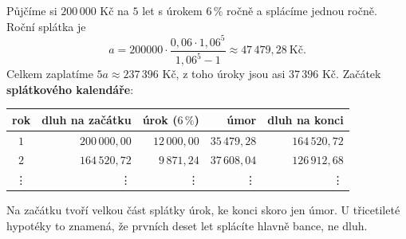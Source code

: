 \begin{example}\label{ex:splatkovy-kalendar}
  Půjčíme si $200\,000$ Kč na $5$ let s úrokem $6\,\%$ ročně a splácíme jednou ročně. Roční splátka je
  \begin{equation*}
    a = 200000\cdot\frac{0{,}06\cdot 1{,}06^5}{1{,}06^5 - 1}\approx 47\,479{,}28\ \text{Kč}.
  \end{equation*}
  Celkem zaplatíme $5a\approx 237\,396$ Kč, z toho úroky jsou asi $37\,396$ Kč. Začátek \textbf{splátkového kalendáře}:
  \begin{center}
    \renewcommand{\arraystretch}{1.3}
    \begin{tabular}{|c|r|r|r|r|}
      \hline
      rok & dluh na začátku & úrok ($6\,\%$) & úmor & dluh na konci \\
      \hline
      $1$ & $200\,000{,}00$ & $12\,000{,}00$ & $35\,479{,}28$ & $164\,520{,}72$ \\
      $2$ & $164\,520{,}72$ & $9\,871{,}24$ & $37\,608{,}04$ & $126\,912{,}68$ \\
      \vdots & \vdots & \vdots & \vdots & \vdots \\
      \hline
    \end{tabular}
  \end{center}
  Na začátku tvoří velkou část splátky úrok, ke konci skoro jen úmor. U třicetileté hypotéky to znamená, že prvních deset let splácíte hlavně bance, ne dluh.


\end{example}
